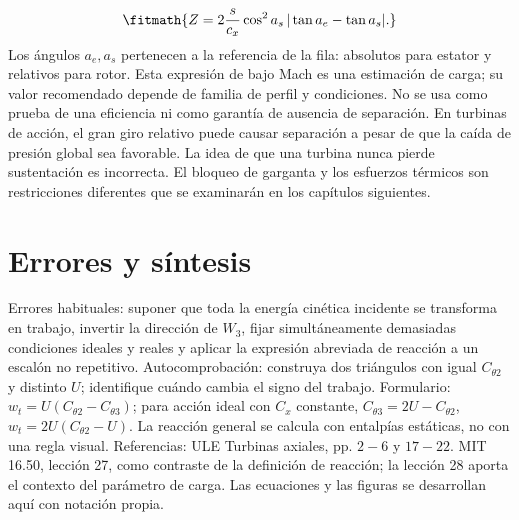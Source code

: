 \documentclass[10pt,openany]{book}
\begin{document}
\[
\fitmath{Z=2\frac{s}{c_x}\cos^2 a_s\,|\tan a_e-\tan a_s|.}
\]
Los ángulos \(a_e,a_s\) pertenecen a la referencia de la fila: absolutos para estator y relativos para rotor. Esta expresión de bajo Mach es una estimación de carga; su valor recomendado depende de familia de perfil y condiciones. No se usa como prueba de una eficiencia ni como garantía de ausencia de separación.
En turbinas de acción, el gran giro relativo puede causar separación a pesar de que la caída de presión global sea favorable. La idea de que una turbina nunca pierde sustentación es incorrecta. El bloqueo de garganta y los esfuerzos térmicos son restricciones diferentes que se examinarán en los capítulos siguientes.

\section{Errores y síntesis}

Errores habituales: suponer que toda la energía cinética incidente se transforma en trabajo, invertir la dirección de \(W_3\), fijar simultáneamente demasiadas condiciones ideales y reales y aplicar la expresión abreviada de reacción a un escalón no repetitivo. Autocomprobación: construya dos triángulos con igual \(C_{\theta2}\) y distinto \(U\); identifique cuándo cambia el signo del trabajo.
Formulario: \(w_t=U(C_{\theta2}-C_{\theta3})\); para acción ideal con \(C_x\) constante, \(C_{\theta3}=2U-C_{\theta2}\), \(w_t=2U(C_{\theta2}-U)\). La reacción general se calcula con entalpías estáticas, no con una regla visual.
Referencias: ULE Turbinas axiales, pp. \(2-6\) y \(17-22\). MIT 16.50, lección 27, como contraste de la definición de reacción; la lección 28 aporta el contexto del parámetro de carga. Las ecuaciones y las figuras se desarrollan aquí con notación propia.
\end{document}
